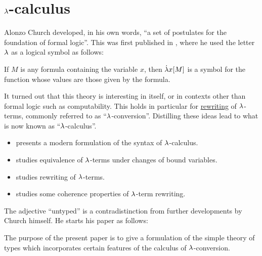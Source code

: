 \chapter{\texorpdfstring{\( {\mathrm \lambda} \)}{λ}-calculus}\label{ch:lambda_calculus}

Alonzo Church developed, in his own words, \enquote{a set of postulates for the foundation of formal logic}. This was first published in \cite{Church1932LambdaCalculus}, where he used the letter \( {\mathrm \lambda} \) as a logical symbol as follows:
\begin{displayquote}
  If \( M \) is any formula containing the variable \( x \), then \( \mathord{\dot{{\mathrm \lambda}}} x [M] \) is a symbol for the function whose values are those given by the formula.
\end{displayquote}

It turned out that this theory is interesting in itself, or in contexts other than formal logic such as computability. This holds in particular for \hyperref[def:rewriting_system]{rewriting} of \( {\mathrm \lambda} \)-terms, commonly referred to as \enquote{\( {\mathrm \lambda} \)-conversion}. Distilling these ideas lead to what is now known as \enquote{\( {\mathrm \lambda} \)-calculus}.

\begin{itemize}
  \item {} presents a modern formulation of the syntax of \( {\mathrm \lambda} \)-calculus.
  \item {} studies equivalence of \( {\mathrm \lambda} \)-terms under changes of bound variables.
  \item {} studies rewriting of \( {\mathrm \lambda} \)-terms.
  \item {} studies some coherence properties of \( {\mathrm \lambda} \)-term rewriting.
\end{itemize}

The adjective \enquote{untyped} is a contradistinction from further developments by Church himself. He starts his paper \cite{Church1940STT} as follows:
\begin{displayquote}
  The purpose of the present paper is to give a formulation of the simple theory of types which incorporates certain features of the calculus of \( {\mathrm \lambda} \)-conversion.
\end{displayquote}


